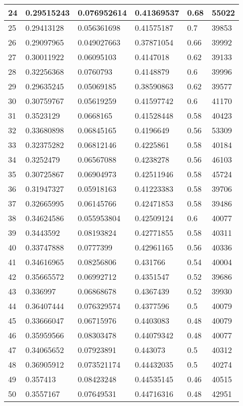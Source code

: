 \begin{longtable}{|l|l|l|l|l|l|}
24 & 0.29515243 & 0.076952614 & 0.41369537 & 0.68 & 55022 \\ \hline 
25 & 0.29413128 & 0.056361698 & 0.41575187 & 0.7 & 39853 \\ \hline 
26 & 0.29097965 & 0.049027663 & 0.37871054 & 0.66 & 39992 \\ \hline 
27 & 0.30011922 & 0.06095103 & 0.4147018 & 0.62 & 39133 \\ \hline 
28 & 0.32256368 & 0.0760793 & 0.4148879 & 0.6 & 39996 \\ \hline 
29 & 0.29635245 & 0.05069185 & 0.38590863 & 0.62 & 39577 \\ \hline 
30 & 0.30759767 & 0.05619259 & 0.41597742 & 0.6 & 41170 \\ \hline 
31 & 0.3523129 & 0.0668165 & 0.41528448 & 0.58 & 40423 \\ \hline 
32 & 0.33680898 & 0.06845165 & 0.4196649 & 0.56 & 53309 \\ \hline 
33 & 0.32375282 & 0.06812146 & 0.4225861 & 0.58 & 40184 \\ \hline 
34 & 0.3252479 & 0.06567088 & 0.4238278 & 0.56 & 46103 \\ \hline 
35 & 0.30725867 & 0.06904973 & 0.42511946 & 0.58 & 45724 \\ \hline 
36 & 0.31947327 & 0.05918163 & 0.41223383 & 0.58 & 39706 \\ \hline 
37 & 0.32665995 & 0.06145766 & 0.42471853 & 0.58 & 39486 \\ \hline 
38 & 0.34624586 & 0.055953804 & 0.42509124 & 0.6 & 40077 \\ \hline 
39 & 0.3443592 & 0.08193824 & 0.42771855 & 0.58 & 40311 \\ \hline 
40 & 0.33747888 & 0.0777399 & 0.42961165 & 0.56 & 40336 \\ \hline 
41 & 0.34616965 & 0.08256806 & 0.431766 & 0.54 & 40004 \\ \hline 
42 & 0.35665572 & 0.06992712 & 0.4351547 & 0.52 & 39686 \\ \hline 
43 & 0.336997 & 0.06868678 & 0.4367439 & 0.52 & 39930 \\ \hline 
44 & 0.36407444 & 0.076329574 & 0.4377596 & 0.5 & 40079 \\ \hline 
45 & 0.33666047 & 0.06715976 & 0.4403083 & 0.48 & 40079 \\ \hline 
46 & 0.35959566 & 0.08303478 & 0.44079342 & 0.48 & 40077 \\ \hline 
47 & 0.34065652 & 0.07923891 & 0.443073 & 0.5 & 40312 \\ \hline 
48 & 0.36905912 & 0.073521174 & 0.44432035 & 0.5 & 40274 \\ \hline 
49 & 0.357413 & 0.08423248 & 0.44535145 & 0.46 & 40515 \\ \hline 
50 & 0.3557167 & 0.07649531 & 0.44716316 & 0.48 & 42951 \\ \hline 
\end{longtable}